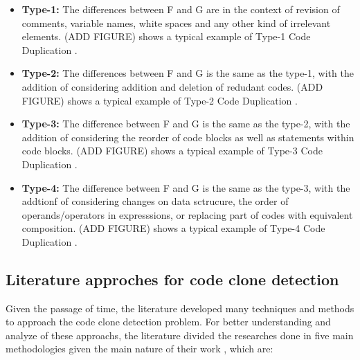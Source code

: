 \begin{itemize}
	\item \textbf{Type-1:} The differences between F and G are in the context of revision of comments, variable names, white spaces and any other kind of irrelevant elements. (ADD FIGURE) shows a typical example of Type-1 Code Duplication \citep{litreview}. 

	\item \textbf{Type-2:} The differences between F and G is the same as the type-1, with the addition of considering addition and deletion of redudant codes. (ADD FIGURE) shows a typical example of Type-2 Code Duplication \citep{litreview}. 

	\item \textbf{Type-3:} The difference between F and G is the same as the type-2, with the addition of considering the reorder of code blocks as well as statements within code blocks. (ADD FIGURE) shows a typical example of Type-3 Code Duplication \citep{litreview}. 

	\item \textbf{Type-4:} The difference between F and G is the same as the type-3, with the addtionf of considering changes on data sctrucure, the order of operands/operators in expresssions, or replacing part of codes with equivalent composition. (ADD FIGURE) shows a typical example of Type-4 Code Duplication \citep{litreview}. 
\end{itemize}

\subsection{Literature approches for code clone detection}

Given the passage of time, the literature developed many techniques and methods to approach the code clone detection problem. 
For better understanding and analyze of these approachs, the literature divided the researches done in
five main methodologies given the main nature of their work \citep{litreview} , which are:

